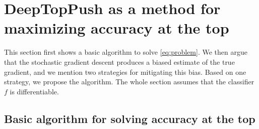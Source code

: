 \section{DeepTopPush as a method for maximizing accuracy at the top}\label{sec:solving}

This section first shows a basic algorithm to solve \eqref{eq:problem}. We then argue that the stochastic gradient descent produces a biased estimate of the true gradient, and we mention two strategies for mitigating this bias. Based on one strategy, we propose the \DeepTopPush algorithm. The whole section assumes that the classifier~$f$ is differentiable.

\subsection{Basic algorithm for solving accuracy at the top}

